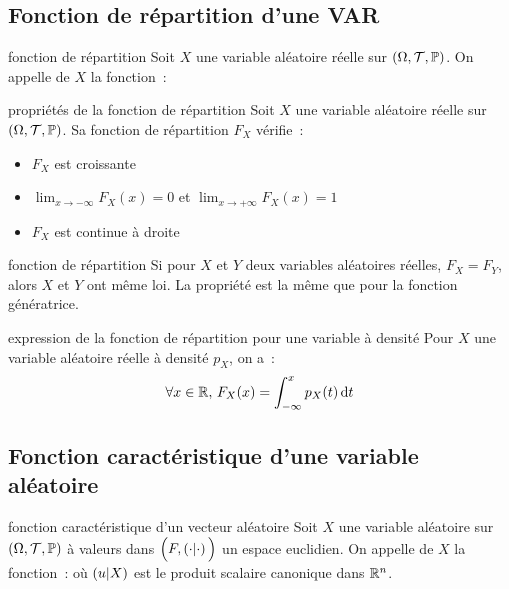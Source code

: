\subsection{Fonction de répartition d'une VAR}

\begin{definition}{}{fonction de répartition}
    Soit $X$ une variable aléatoire réelle sur $(\Omega, \mathcal{T}, \mathbb{P})$. On appelle  de $X$ la fonction~:
\end{definition}

\begin{proposition}{}{propriétés de la fonction de répartition}
    Soit $X$ une variable aléatoire réelle sur $(\Omega, \mathcal{T}, \mathbb{P})$. Sa fonction de répartition $F_X$ vérifie~:
    \begin{itemize}
        \item $F_X$ est croissante
        \item $\lim_{x \to -\infty} F_X(x) = 0$ et $\lim_{x \to +\infty} F_X(x) = 1$
        \item $F_X$ est continue à droite
    \end{itemize}
\end{proposition}

\begin{remarque}{}{fonction de répartition}
    Si pour $X$ et $Y$ deux variables aléatoires réelles, $F_X = F_Y$, alors $X$ et $Y$ ont même loi. La propriété est la même que pour la fonction génératrice.
\end{remarque}

\begin{proposition}{}{expression de la fonction de répartition pour une variable à densité}
    Pour $X$ une variable aléatoire réelle à densité $p_X$, on a~:
    $$\forall x \in \mathbb{R},\, F_X(x) = \int_{-\infty}^x p_X(t) \,\mathrm{d}t$$
\end{proposition}

\subsection{Fonction caractéristique d'une variable aléatoire}

\begin{definition}{}{fonction caractéristique d'un vecteur aléatoire}
    Soit $X$ une variable aléatoire sur $(\Omega, \mathcal{T}, \mathbb{P})$ à valeurs dans $\Big(F, \left( \cdot | \cdot \right)\Big)$ un espace euclidien. On appelle  de $X$ la fonction~:
    où $\left( u | X \right)$ est le produit scalaire canonique dans $\mathbb{R}^n$.
\end{definition}

